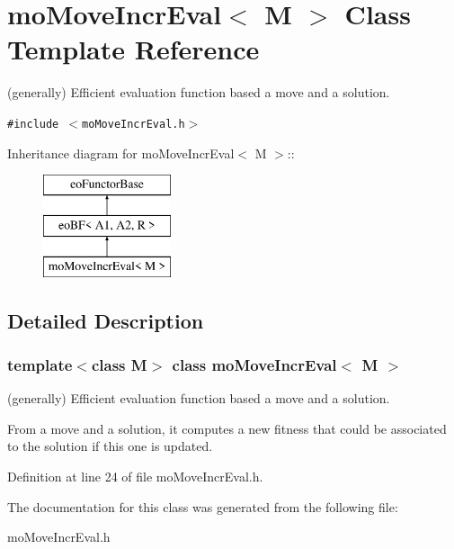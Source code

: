 \section{mo\-Move\-Incr\-Eval$<$ M $>$ Class Template Reference}
\label{classmo_move_incr_eval}
(generally) Efficient evaluation function based a move and a solution.  


{\tt \#include $<$mo\-Move\-Incr\-Eval.h$>$}

Inheritance diagram for mo\-Move\-Incr\-Eval$<$ M $>$::\begin{figure}[H]
\begin{center}
\leavevmode
\includegraphics[height=3cm]{classmo_move_incr_eval}
\end{center}
\end{figure}


\subsection{Detailed Description}
\subsubsection*{template$<$class M$>$ class mo\-Move\-Incr\-Eval$<$ M $>$}

(generally) Efficient evaluation function based a move and a solution. 

From a move and a solution, it computes a new fitness that could be associated to the solution if this one is updated. 



Definition at line 24 of file mo\-Move\-Incr\-Eval.h.

The documentation for this class was generated from the following file:\begin{CompactItemize}
\item 
mo\-Move\-Incr\-Eval.h\end{CompactItemize}
